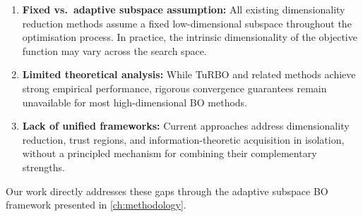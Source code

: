 \begin{enumerate}
    \item \textbf{Fixed vs.\ adaptive subspace assumption:} All existing
    dimensionality reduction methods assume a fixed low-dimensional subspace
    throughout the optimisation process.  In practice, the intrinsic
    dimensionality of the objective function may vary across the search space.

    \item \textbf{Limited theoretical analysis:} While TuRBO and related
    methods achieve strong empirical performance, rigorous convergence guarantees
    remain unavailable for most high-dimensional BO methods.

    \item \textbf{Lack of unified frameworks:} Current approaches address
    dimensionality reduction, trust regions, and information-theoretic
    acquisition in isolation, without a principled mechanism for combining their
    complementary strengths.
\end{enumerate}

Our work directly addresses these gaps through the adaptive subspace BO
framework presented in \cref{ch:methodology}.
